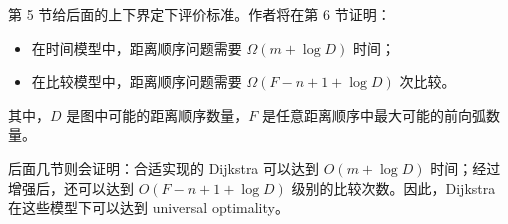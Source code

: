 \documentclass[UTF8]{ctexart}
\begin{document}
第 5 节给后面的上下界定下评价标准。作者将在第 6 节证明：

\begin{itemize}
  \item 在时间模型中，距离顺序问题需要 \(\Omega(m+\log D)\) 时间；
  \item 在比较模型中，距离顺序问题需要 \(\Omega(F-n+1+\log D)\) 次比较。
\end{itemize}

其中，\(D\) 是图中可能的距离顺序数量，\(F\) 是任意距离顺序中最大可能的前向弧数量。

后面几节则会证明：合适实现的 Dijkstra 可以达到 \(O(m+\log D)\) 时间；经过增强后，还可以达到 \(O(F-n+1+\log D)\) 级别的比较次数。因此，Dijkstra 在这些模型下可以达到 universal optimality。
\end{document}
